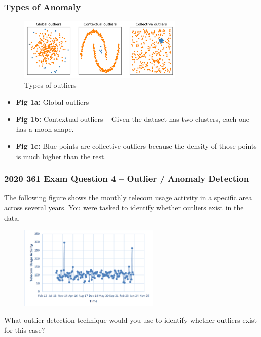 \documentclass[aspectratio=169, 10pt]{beamer}
\begin{document}
\begin{frame}
    \frametitle{Types of Anomaly}
    \small

    \begin{figure}
        \centering
        \includegraphics[width=0.7\textwidth]{../imgs/outlier_examples.pdf}
        \caption{Types of outliers}
    \end{figure}

    \begin{itemize}
        \item \textbf{Fig 1a:} Global outliers
        \item \textbf{Fig 1b:} Contextual outliers -- Given the dataset has two clusters, each one has a moon shape.
        \item \textbf{Fig 1c:} Blue points are collective outliers because the density of those points is much higher than the rest.
    \end{itemize}

\end{frame}

\begin{frame}
    \frametitle{2020 361 Exam Question 4 -- Outlier / Anomaly Detection}
    \small

    The following figure shows the monthly telecom usage activity in a specific area across
    several years. You were tasked to identify whether outliers exist in the data.

    \begin{figure}
        \centering
        \includegraphics[width=0.6\textwidth]{../imgs/question4.png}
    \end{figure}
    
    What outlier detection technique would you use to identify whether outliers exist for this case?
\end{frame}
\end{document}

